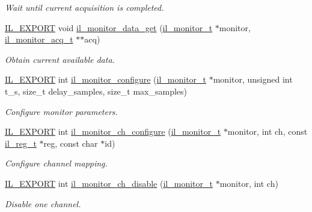 \begin{DoxyCompactItemize}
\begin{DoxyCompactList}\small\item\em Wait until current acquisition is completed. \end{DoxyCompactList}\item 
\hyperlink{common_8h_a6bb629d26c52bfe10519ba3176853f47}{I\+L\+\_\+\+E\+X\+P\+O\+RT} void \hyperlink{group__IL__MONITOR_gad6231f5d154969361fdd05d3f84707bb}{il\+\_\+monitor\+\_\+data\+\_\+get} (\hyperlink{group__IL__MONITOR_ga40e12e851c8c83202f0bccbaaafbc1f3}{il\+\_\+monitor\+\_\+t} $\ast$monitor, \hyperlink{structil__monitor__acq__t}{il\+\_\+monitor\+\_\+acq\+\_\+t} $\ast$$\ast$acq)
\begin{DoxyCompactList}\small\item\em Obtain current available data. \end{DoxyCompactList}\item 
\hyperlink{common_8h_a6bb629d26c52bfe10519ba3176853f47}{I\+L\+\_\+\+E\+X\+P\+O\+RT} int \hyperlink{group__IL__MONITOR_ga8fc675f7d849ebcf162e396a98b6c710}{il\+\_\+monitor\+\_\+configure} (\hyperlink{group__IL__MONITOR_ga40e12e851c8c83202f0bccbaaafbc1f3}{il\+\_\+monitor\+\_\+t} $\ast$monitor, unsigned int t\+\_\+s, size\+\_\+t delay\+\_\+samples, size\+\_\+t max\+\_\+samples)
\begin{DoxyCompactList}\small\item\em Configure monitor parameters. \end{DoxyCompactList}\item 
\hyperlink{common_8h_a6bb629d26c52bfe10519ba3176853f47}{I\+L\+\_\+\+E\+X\+P\+O\+RT} int \hyperlink{group__IL__MONITOR_gacda4fa0bc57e96988e62f895b256a62a}{il\+\_\+monitor\+\_\+ch\+\_\+configure} (\hyperlink{group__IL__MONITOR_ga40e12e851c8c83202f0bccbaaafbc1f3}{il\+\_\+monitor\+\_\+t} $\ast$monitor, int ch, const \hyperlink{structil__reg__t}{il\+\_\+reg\+\_\+t} $\ast$reg, const char $\ast$id)
\begin{DoxyCompactList}\small\item\em Configure channel mapping. \end{DoxyCompactList}\item 
\hyperlink{common_8h_a6bb629d26c52bfe10519ba3176853f47}{I\+L\+\_\+\+E\+X\+P\+O\+RT} int \hyperlink{group__IL__MONITOR_ga33dffe1563b9d4a53d7623a123d7710c}{il\+\_\+monitor\+\_\+ch\+\_\+disable} (\hyperlink{group__IL__MONITOR_ga40e12e851c8c83202f0bccbaaafbc1f3}{il\+\_\+monitor\+\_\+t} $\ast$monitor, int ch)
\begin{DoxyCompactList}\small\item\em Disable one channel. \end{DoxyCompactList}\item 
$$
\end{DoxyCompactItemize}
